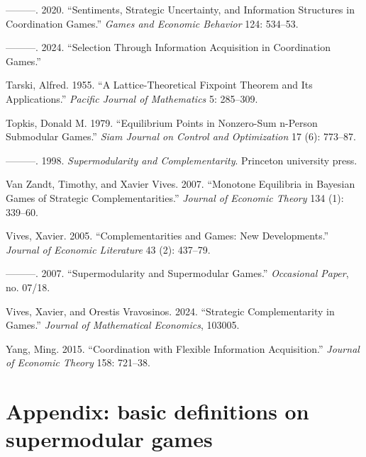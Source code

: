 \documentclass[
]{article}
\newlength{\cslhangindent}
\newenvironment{CSLReferences}[2] %
 {\begin{list}{}{%
  \setlength{\itemindent}{0pt}
  \setlength{\leftmargin}{0pt}
  \setlength{\parsep}{0pt}
  \ifodd #1
   \setlength{\leftmargin}{\cslhangindent}
   \setlength{\itemindent}{-1\cslhangindent}
  \fi
  \setlength{\itemsep}{#2\baselineskip}}}
 {\end{list}}
\theoremstyle{plain}
\theoremstyle{definition}
\theoremstyle{remark}
\begin{document}
\begin{CSLReferences}{1}{0}
---------. 2020. {``Sentiments, Strategic Uncertainty, and Information
Structures in Coordination Games.''} \emph{Games and Economic Behavior}
124: 534--53.

---------. 2024. {``Selection Through Information Acquisition in
Coordination Games.''}

Tarski, Alfred. 1955. {``A Lattice-Theoretical Fixpoint Theorem and Its
Applications.''} \emph{Pacific Journal of Mathematics} 5: 285--309.

Topkis, Donald M. 1979. {``Equilibrium Points in Nonzero-Sum n-Person
Submodular Games.''} \emph{Siam Journal on Control and Optimization} 17
(6): 773--87.

---------. 1998. \emph{Supermodularity and Complementarity}. Princeton
university press.

Van Zandt, Timothy, and Xavier Vives. 2007. {``Monotone Equilibria in
Bayesian Games of Strategic Complementarities.''} \emph{Journal of
Economic Theory} 134 (1): 339--60.

Vives, Xavier. 2005. {``Complementarities and Games: New
Developments.''} \emph{Journal of Economic Literature} 43 (2): 437--79.

---------. 2007. {``Supermodularity and Supermodular Games.''}
\emph{Occasional Paper}, no. 07/18.

Vives, Xavier, and Orestis Vravosinos. 2024. {``Strategic
Complementarity in Games.''} \emph{Journal of Mathematical Economics},
103005.

Yang, Ming. 2015. {``Coordination with Flexible Information
Acquisition.''} \emph{Journal of Economic Theory} 158: 721--38.

\end{CSLReferences}

\newpage

\section*{Appendix: basic definitions on supermodular
games}\label{appendix-basic-definitions-on-supermodular-games}
\end{document}
